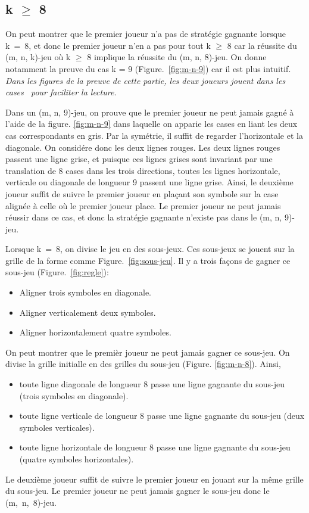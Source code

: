 \documentclass{beamer}
\begin{document}
\subsection{k $\ge$ 8}
On peut montrer que le premier joueur n'a pas de stratégie gagnante lorsque k~=~8, et donc le premier joueur n'en a pas pour tout k $\ge$ 8 car la réussite du (m, n, k)-jeu où k $\ge$ 8 implique la réussite du (m, n, 8)-jeu. On donne notamment la preuve du cas k = 9 \mbox{(Figure. \ref{fig:m-n-9})} car il est plus intuitif.\\
\textit{Dans les figures de la preuve de cette partie, les deux joueurs jouent \og dans les cases \fg \ pour faciliter la lecture.}\par

Dans un (m, n, 9)-jeu, on prouve que le premier joueur ne peut jamais gagné à l'aide de la figure. \ref{fig:m-n-9} dans laquelle on apparie les cases en liant les deux cas correspondants en gris. Par la symétrie, il suffit de regarder l'horizontale et la diagonale. On considére donc les deux lignes rouges. Les deux lignes rouges passent une ligne grise, et puisque ces lignes grises sont invariant par une translation de 8 cases dans les trois directions, toutes les lignes horizontale, verticale ou diagonale de longueur 9 passent une ligne grise. Ainsi, le deuxième joueur suffit de suivre le premier joueur en plaçant son symbole sur la case alignée à celle où le premier joueur place. Le premier joueur ne peut jamais réussir dans ce cas, et donc la stratégie gagnante n'existe pas dans le (m, n, 9)-jeu.\par
Lorsque k~=~8, on divise le jeu en des sous-jeux. Ces sous-jeux se jouent sur la grille de la forme comme \mbox{Figure. \ref{fig:sous-jeu}.}
Il y a trois façons de gagner ce sous-jeu \mbox{(Figure. \ref{fig:regle}):}
\begin{itemize}
    \item Aligner trois symboles en diagonale.
    \item Aligner verticalement deux symboles.
    \item Aligner horizontalement quatre symboles.
\end{itemize}
On peut montrer que le premièr joueur ne peut jamais gagner ce sous-jeu. On divise la grille initialle en des grilles du sous-jeu (Figure. \ref{fig:m-n-8}). Ainsi, 
\begin{itemize}
    \item toute ligne diagonale de longueur 8 passe une ligne gagnante du sous-jeu (trois symboles en diagonale).
    \item toute ligne verticale de longueur 8 passe une ligne gagnante du sous-jeu (deux symboles verticales).
    \item toute ligne horizontale de longueur 8 passe une ligne gagnante du sous-jeu (quatre symboles horizontales).
\end{itemize}
Le deuxième joueur suffit de suivre le premier joueur en jouant sur la même grille du sous-jeu. Le premier joueur ne peut jamais gagner le sous-jeu donc le \mbox{(m, n, 8)-jeu}.
\end{document}
